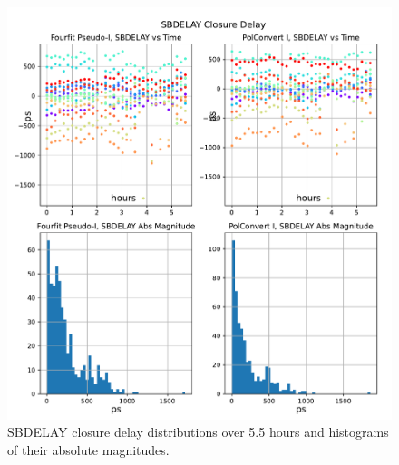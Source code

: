 \documentclass[letterpaper,twoside,12pt]{article}
\begin{document}
\begin{figure}[ht!]
  \begin{center}
  \includegraphics[width=35pc]{SBDELAY_Closure_Delay.pdf}
  \caption{\small SBDELAY closure delay distributions over 5.5 hours and histograms of their absolute magnitudes.}
  \label{sbd}
  \end{center}
\end{figure}
\end{document}
